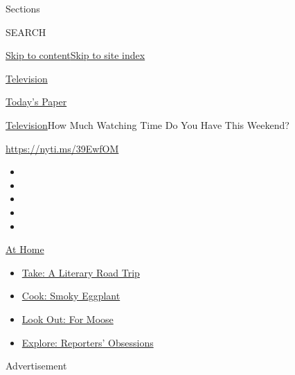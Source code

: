 Sections

SEARCH

\protect\hyperlink{site-content}{Skip to
content}\protect\hyperlink{site-index}{Skip to site index}

\href{https://www.nytimes.com/section/arts/television}{Television}

\href{https://myaccount.nytimes.com/auth/login?response_type=cookie\&client_id=vi}{}

\href{https://www.nytimes.com/section/todayspaper}{Today's Paper}

\href{/section/arts/television}{Television}\textbar{}How Much Watching
Time Do You Have This Weekend?

\url{https://nyti.ms/39EwfOM}

\begin{itemize}
\item
\item
\item
\item
\item
\end{itemize}

\href{https://www.nytimes.com/spotlight/at-home?action=click\&pgtype=Article\&state=default\&region=TOP_BANNER\&context=at_home_menu}{At
Home}

\begin{itemize}
\tightlist
\item
  \href{https://www.nytimes.com/2020/07/28/books/time-for-a-literary-road-trip.html?action=click\&pgtype=Article\&state=default\&region=TOP_BANNER\&context=at_home_menu}{Take:
  A Literary Road Trip}
\item
  \href{https://www.nytimes.com/2020/07/29/magazine/bored-with-your-home-cooking-some-smoky-eggplant-will-fix-that.html?action=click\&pgtype=Article\&state=default\&region=TOP_BANNER\&context=at_home_menu}{Cook:
  Smoky Eggplant}
\item
  \href{https://www.nytimes.com/2020/07/27/travel/moose-michigan-isle-royale.html?action=click\&pgtype=Article\&state=default\&region=TOP_BANNER\&context=at_home_menu}{Look
  Out: For Moose}
\item
  \href{https://www.nytimes.com/interactive/2020/at-home/even-more-reporters-editors-diaries-lists-recommendations.html?action=click\&pgtype=Article\&state=default\&region=TOP_BANNER\&context=at_home_menu}{Explore:
  Reporters' Obsessions}
\end{itemize}

Advertisement

